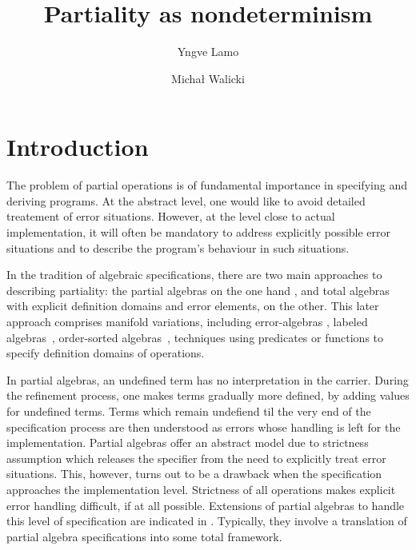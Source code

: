 \documentclass[10pt]{article}
\begin{document}
\title{Partiality as nondeterminism}
\author{Yngve Lamo \and Micha{\l} Walicki}
\date{{}}
\maketitle


\section{Introduction}
The problem of partial operations is of fundamental importance in specifying
and deriving programs. At the abstract level, one would like to avoid
detailed treatement of error situations.  However, at the level close to
actual implementation, it will often be mandatory to address explicitly
possible error situations and to describe the program's behaviour in such
situations. 

In the tradition of algebraic specifications, there are two main
approaches to describing partiality: the partial algebras
on the one hand \cite{burm,reichel,state}, and total algebras with explicit
definition domains and error elements,
on the other. This later approach comprises manifold variations, including
error-algebras \cite{error}, labeled algebras~\cite{label}, 
order-sorted algebras~\cite{order1}, techniques using predicates \cite{member} or
functions \cite{guard} to specify definition domains of operations.

In
partial algebras, an undefined term has no interpretation in the
carrier. During the refinement process, one makes terms gradually more
defined, by adding values for undefined terms. Terms which remain undefiend
til the very end of the specification process are then understood as errors whose
handling is left for the implementation. Partial algebras offer an
abstract model due to strictness assumption
which releases the specifier from the need to explicitly treat error
situations. This, however, turns out to be a drawback when the specification
approaches the implementation level. Strictness of all operations makes
explicit error handling 
difficult, if at all possible. Extensions of partial algebras to
handle this level of specification are indicated in \cite{state,lazy}. Typically,
they involve a translation of partial algebra
specifications into some total framework. %
\end{document}
